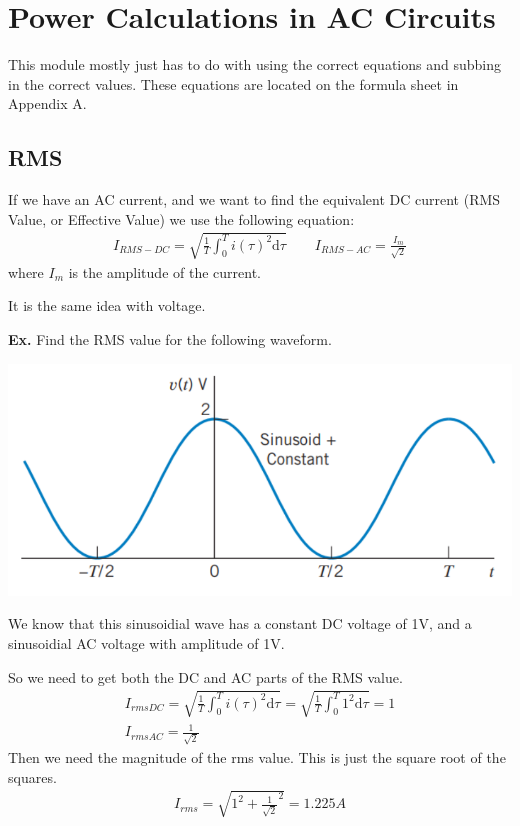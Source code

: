 \documentclass[12pt,letterpaper]{article} \usepackage{amsmath} \usepackage{graphicx} \usepackage[margin=1in]{geometry} \usepackage{longtable}  \usepackage{amssymb}
\begin{document}
	\section{Power Calculations in AC Circuits}
	This module mostly just has to do with using the correct equations and subbing in the correct values. These equations are located on the formula sheet in Appendix A.
	
	\subsection{RMS}
	
	If we have an AC current, and we want to find the equivalent DC current (RMS Value, or Effective Value) we use the following equation:
	\begin{align*}
		I_{RMS-DC} = \sqrt{\frac{1}{T} \int_0^T i(\tau)^2 \mathrm{d}\tau} \qquad I_{RMS-AC} = \frac{I_m}{\sqrt{2}}
	\end{align*} 
	where $I_m$ is the amplitude of the current.

	It is the same idea with voltage. 
	
	\begin{mdframed}[]
	\textbf{Ex.} Find the RMS value for the following waveform. 
	\begin{center}
		\includegraphics[width=0.5\linewidth]{ex4}
	\end{center}
	We know that this sinusoidial wave has a constant DC voltage of 1V, and a sinusoidial AC voltage with amplitude of 1V. 
	
	So we need to get both the DC and AC parts of the RMS value. 
	\begin{align*}
		I_{rmsDC} = \sqrt{\frac{1}{T} \int_0^T i(\tau)^2 \mathrm{d}\tau} = \sqrt{\frac{1}{T} \int_0^T 1^2 \mathrm{d}\tau} = 1\\
		I_{rmsAC} = \frac{1}{\sqrt 2}
	\end{align*}
	Then we need the magnitude of the rms value. This is just the square root of the squares.
	\begin{align*}
		I_{rms} = \sqrt{1^2 + \frac{1}{\sqrt 2}^2} = 1.225 A
	\end{align*}
	
	\end{mdframed}
\end{document}
